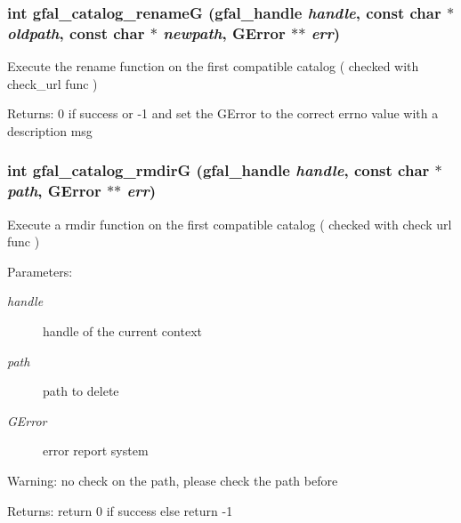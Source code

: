 \subsubsection{\setlength{\rightskip}{0pt plus 5cm}int gfal\_\-catalog\_\-rename\-G (gfal\_\-handle {\em handle}, const char $\ast$ {\em oldpath}, const char $\ast$ {\em newpath}, GError $\ast$$\ast$ {\em err})}\label{gfal__common__catalog_8c_99ffb13510951a6fe79f3c33305ea189}


Execute the rename function on the first compatible catalog ( checked with check\_\-url func ) \begin{Desc}
\item[Returns:]0 if success or -1 and set the GError to the correct errno value with a description msg \end{Desc}
\subsubsection{\setlength{\rightskip}{0pt plus 5cm}int gfal\_\-catalog\_\-rmdir\-G (gfal\_\-handle {\em handle}, const char $\ast$ {\em path}, GError $\ast$$\ast$ {\em err})}\label{gfal__common__catalog_8c_9cd4da87728df80003fe8618c4f63e13}


Execute a rmdir function on the first compatible catalog ( checked with check url func ) \begin{Desc}
\item[Parameters:]
\begin{description}
\item[{\em handle}]handle of the current context \item[{\em path}]path to delete \item[{\em GError}]error report system \end{description}
\end{Desc}
\begin{Desc}
\item[Warning:]no check on the path, please check the path before \end{Desc}
\begin{Desc}
\item[Returns:]return 0 if success else return -1 \end{Desc}
